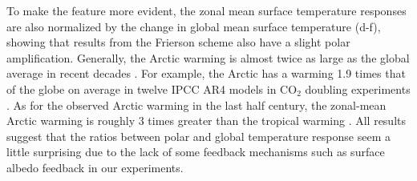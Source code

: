 To make the feature more evident, the zonal mean surface temperature responses are also normalized by the change in global mean surface temperature (d-f), showing that results from the Frierson scheme also have a slight polar amplification. Generally, the Arctic warming is almost twice as large as the global average in recent decades \citep{Serreze2006}. For example, the Arctic has a warming 1.9 times that of the globe on average in twelve IPCC AR4 models in CO$_2$ doubling experiments \citep{Winton2006surface}. As for the observed Arctic warming in the last half century, the zonal-mean Arctic warming is roughly 3 times greater than the tropical warming \citep{Merlis2018}. All results suggest that the ratios between polar and global temperature response seem a little surprising due to the lack of some feedback mechanisms such as surface albedo feedback in our experiments.

% 



